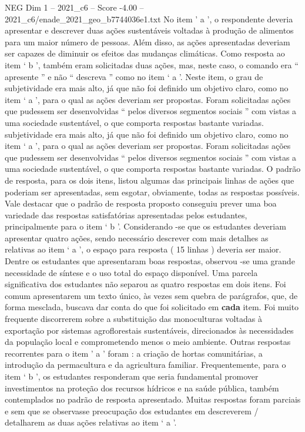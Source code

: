 \begin{textsample}{NEG Dim 1 – 2021\_c6 – Score -4.00 – 2021\_c6/enade\_2021\_geo\_b7744036e1.txt}
No item ’ a ’, o respondente deveria apresentar e descrever duas ações sustentáveis voltadas à produção de alimentos para um maior número de pessoas.
Além disso, as ações apresentadas deveriam ser capazes de diminuir os efeitos das mudanças climáticas.
Como resposta ao item ‘ b ’, também eram solicitadas duas ações, mas, neste caso, o comando era “ apresente ” e não “ descreva ” como no item ‘ a ’.
Neste item, o grau de subjetividade era mais alto, já que não foi definido um objetivo claro, como no item ‘ a ’, para o qual as ações deveriam ser propostas.
Foram solicitadas ações que pudessem ser desenvolvidas “ pelos diversos segmentos sociais ” com vistas a uma sociedade sustentável, o que comporta respostas bastante variadas. subjetividade era mais alto, já que não foi definido um objetivo claro, como no item ‘ a ’, para o qual as ações deveriam ser propostas.
Foram solicitadas ações que pudessem ser desenvolvidas “ pelos diversos segmentos sociais ” com vistas a uma sociedade sustentável, o que comporta respostas bastante variadas.
O padrão de resposta, para os dois itens, listou algumas das principais linhas de ações que poderiam ser apresentadas, sem esgotar, obviamente, todas as respostas possíveis.
Vale destacar que o padrão de resposta proposto conseguiu prever uma boa variedade das respostas satisfatórias apresentadas pelos estudantes, principalmente para o item ‘ b ’.
Considerando -se que os estudantes deveriam apresentar quatro ações, sendo necessário descrever com mais detalhes as relativas ao item ‘ a ’, o espaço para resposta ( 15 linhas ) deveria ser maior.
Dentre os estudantes que apresentaram boas respostas, observou -se uma grande necessidade de síntese e o uso total do espaço disponível.
Uma parcela significativa dos estudantes não separou as quatro respostas em dois itens.
Foi comum apresentarem um texto único, às vezes sem quebra de parágrafos, que, de forma mesclada, buscava dar conta do que foi solicitado em \textbf{cada} item.
Foi muito frequente discorrerem sobre a substituição das monoculturas voltadas à exportação por sistemas agroflorestais sustentáveis, direcionados às necessidades da população local e comprometendo menos o meio ambiente.
Outras respostas recorrentes para o item ’ a ’ foram : a criação de hortas comunitárias, a introdução da permacultura e da agricultura familiar.
Frequentemente, para o item ‘ b ’, os estudantes responderam que seria fundamental promover investimentos na proteção dos recursos hídricos e na saúde pública, também contemplados no padrão de resposta apresentado.
Muitas respostas foram parciais e sem que se observasse preocupação dos estudantes em descreverem / detalharem as duas ações relativas ao item ‘ a ’.

\end{textsample}
